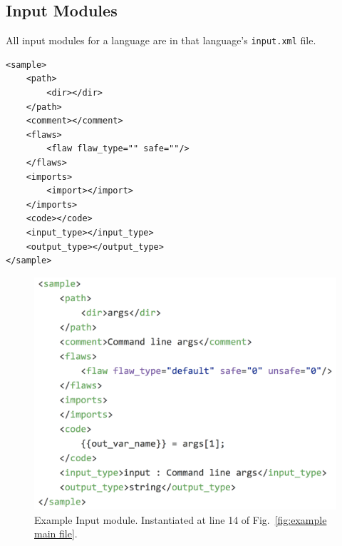 \documentclass[12pt]{article}
\begin{document}
\subsection{Input Modules}
\label{sec: input module}

All input modules for a language are in that language's \verb|input.xml|
file.

\begin{verbatim}
<sample>
    <path>
        <dir></dir>
    </path>
    <comment></comment>
    <flaws>
        <flaw flaw_type="" safe=""/>
    </flaws>
    <imports>
        <import></import>
    </imports>
    <code></code>
    <input_type></input_type>
    <output_type></output_type>
</sample>
\end{verbatim}

\begin{figure}[htb]
  \includegraphics{fig_Input_file.png}
  \caption{Example Input module.  Instantiated at line 14 of 
  Fig.~\ref{fig:example main file}.}
  \label{fig:example input file}
\end{figure}
\end{document}
